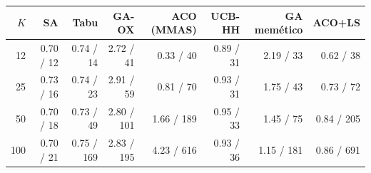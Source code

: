 \begin{tabular}{rrrrrrrr}
\toprule
$K$ & SA & Tabu & GA-OX & ACO (MMAS) & UCB-HH & GA memético & ACO+LS \\
\midrule
12 & 0.70 / 12 & 0.74 / 14 & 2.72 / 41 & 0.33 / 40 & 0.89 / 31 & 2.19 / 33 & 0.62 / 38 \\
25 & 0.73 / 16 & 0.74 / 23 & 2.91 / 59 & 0.81 / 70 & 0.93 / 31 & 1.75 / 43 & 0.73 / 72 \\
50 & 0.70 / 18 & 0.73 / 49 & 2.80 / 101 & 1.66 / 189 & 0.95 / 33 & 1.45 / 75 & 0.84 / 205 \\
100 & 0.70 / 21 & 0.75 / 169 & 2.83 / 195 & 4.23 / 616 & 0.93 / 36 & 1.15 / 181 & 0.86 / 691 \\
\bottomrule
\end{tabular}
